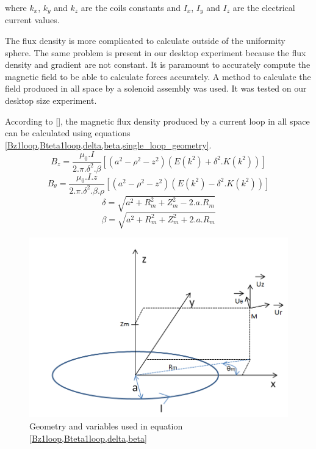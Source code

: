 \documentclass[letterpaper, 10 pt, conference]{ieeeconf}  %
\begin{document}
where $k_x$, $k_y$ and $k_z$ are the coils constants and $I_x$, $I_y$ and $I_z$ are the electrical current values.\par

The flux density is more complicated to calculate outside of the uniformity sphere. The same problem is present in our desktop experiment because the flux density and gradient are not constant. It is paramount to accurately compute the magnetic field to be able to calculate forces accurately. A method to calculate the field produced in all space by a solenoid assembly was used. It was tested on our desktop size experiment.\par
According to [], the magnetic flux density produced by a current loop in all space can be calculated using equations \cref{Bz1loop,Bteta1loop,delta,beta,single_loop_geometry}.
\begin{equation}
B_z=\frac{\mu _0.I}{2.\pi.\delta ^{2}.\beta  }\left [ \left ( a^2-\rho ^2-z^2 \right )(E(k^2)+\delta ^2.K(k^2)) \right ] 
\label{Bz1loop}
\end{equation}
\begin{equation}
B_\theta=\frac{\mu _0.I.z}{2.\pi.\delta ^{2}.\beta.\rho   }\left [ \left ( a^2-\rho ^2-z^2 \right )(E(k^2)-\delta ^2.K(k^2)) \right ]
\label{Bteta1loop}
\end{equation}
\begin{equation}
\delta =\sqrt{a^2+R_m^2+Z_m^2-2.a.R_m}
\label{delta}
\end{equation}
\begin{equation}
\beta =\sqrt{a^2+R_m^2+Z_m^2+2.a.R_m}
\label{beta}
\end{equation}

\begin{figure}
  \includegraphics[width=\linewidth]{single_loop.png}
  \caption{Geometry and variables used in equation \cref{Bz1loop,Bteta1loop,delta,beta}}
  \label{single_loop_geometry}
\end{figure}
\end{document}
